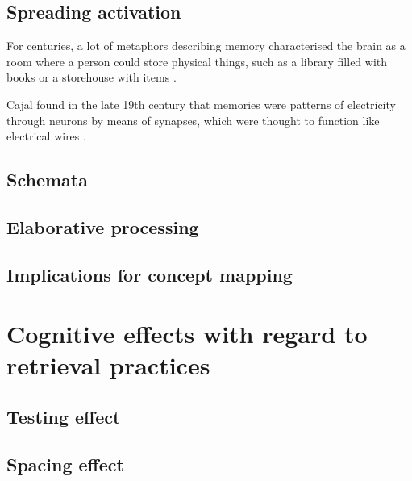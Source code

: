 \subsection{Spreading activation}

For centuries, a lot of metaphors describing memory characterised the brain as a room where a person could store physical things, such as a library filled with books or a storehouse with items \cite{roediger}.

Cajal found in the late 19th century that memories were patterns of electricity through neurons by means of synapses, which were thought to function like electrical wires \cite{longtermpotentiation}. 

\subsection{Schemata}

\subsection{Elaborative processing}

\subsection{Implications for concept mapping}


\section{Cognitive effects with regard to retrieval practices}

\subsection{Testing effect}




\subsection{Spacing effect}

